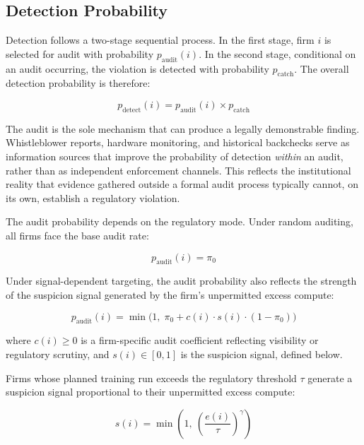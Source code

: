 \subsection{Detection Probability}
\label{sec:detection}

Detection follows a two-stage sequential process. In the first stage, firm $i$ is selected for audit with probability $p_{\mathrm{audit}}(i)$. In the second stage, conditional on an audit occurring, the violation is detected with probability $p_{\mathrm{catch}}$. The overall detection probability is therefore:

\begin{equation}
p_{\mathrm{detect}}(i) = p_{\mathrm{audit}}(i) \times p_{\mathrm{catch}}
\label{eq:detect}
\end{equation}

The audit is the sole mechanism that can produce a legally demonstrable finding. Whistleblower reports, hardware monitoring, and historical backchecks serve as information sources that improve the probability of detection \emph{within} an audit, rather than as independent enforcement channels. This reflects the institutional reality that evidence gathered outside a formal audit process typically cannot, on its own, establish a regulatory violation.

The audit probability depends on the regulatory mode. Under random auditing, all firms face the base audit rate:

\begin{equation}
p_{\mathrm{audit}}(i) = \pi_0
\label{eq:audit-random}
\end{equation}

Under signal-dependent targeting, the audit probability also reflects the strength of the suspicion signal generated by the firm's unpermitted excess compute:

\begin{equation}
p_{\mathrm{audit}}(i) = \min\!\Big(1,\; \pi_0 + c(i) \cdot s(i) \cdot (1 - \pi_0)\Big)
\label{eq:audit-signal}
\end{equation}

where $c(i) \geq 0$ is a firm-specific audit coefficient reflecting visibility or regulatory scrutiny, and $s(i) \in [0,1]$ is the suspicion signal, defined below.

Firms whose planned training run exceeds the regulatory threshold $\tau$ generate a suspicion signal proportional to their unpermitted excess compute:

\begin{equation}
s(i) = \min\!\left(1,\ \left(\frac{e(i)}{\tau}\right)^{\!\gamma}\right)
\label{eq:signal}
\end{equation}

